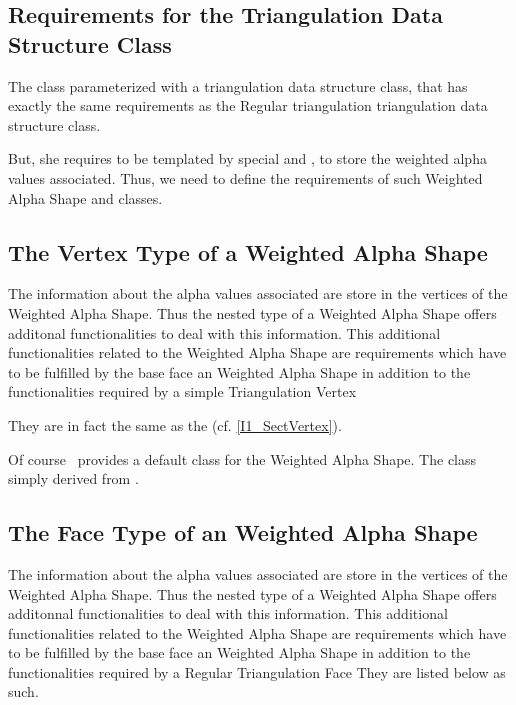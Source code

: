 \subsection{Requirements for the Triangulation Data Structure Class}

The class  parameterized with a
triangulation data structure class, that has exactly the same
requirements as the Regular triangulation triangulation data
structure class. 

But, she requires to be templated by special  and
, to store the weighted alpha values associated. Thus, we need to
define the requirements of such Weighted Alpha Shape  and
 classes.

\subsection{The Vertex Type of a Weighted Alpha Shape} 

The information about the alpha values associated  are store in the 
vertices of the Weighted Alpha Shape. Thus the nested 
type of a Weighted Alpha Shape offers additonal functionalities to deal with this information.
This additional functionalities related to the Weighted Alpha Shape
are requirements which have to be fulfilled
by the base face  an Weighted Alpha Shape
in addition to the functionalities required by a simple Triangulation Vertex

They are in fact the same as the 
(cf. \ref{I1_SectVertex}).

Of course  \cgal\ provides a default  class
for the Weighted Alpha Shape. The class
 simply derived from 
.


\subsection{The Face Type of an Weighted Alpha Shape} 

The information about the alpha values associated  are store in the 
vertices of the Weighted Alpha Shape. Thus the nested 
type of a Weighted Alpha Shape offers additonnal functionalities to deal with this information.
This additional functionalities related to the Weighted Alpha Shape
are requirements which have to be fulfilled
by the base face  an Weighted Alpha Shape
in addition to the functionalities required by a Regular Triangulation Face
They are listed below as such.



